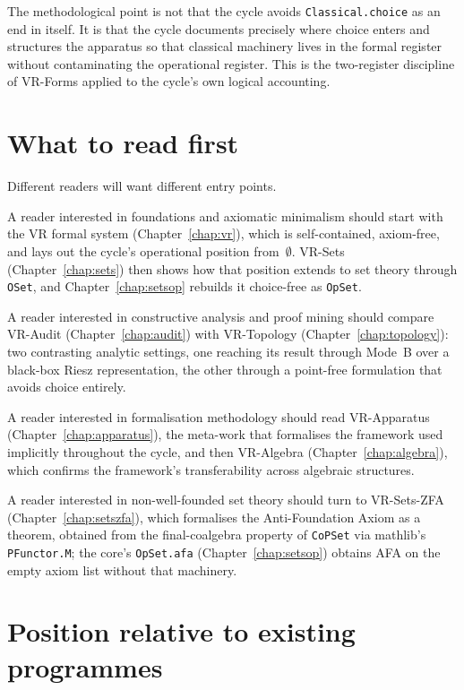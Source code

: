 The methodological point is not that the cycle avoids
\texttt{Classical.choice} as an end in itself.  It is that the cycle
documents precisely where choice enters and structures the apparatus so
that classical machinery lives in the formal register without contaminating
the operational register.  This is the two-register discipline of VR-Forms
applied to the cycle's own logical accounting.

\section{What to read first}
\label{sec:overview_reading}

Different readers will want different entry points.

A reader interested in foundations and axiomatic minimalism should start
with the VR formal system (Chapter~\ref{chap:vr}), which is self-contained,
axiom-free, and lays out the cycle's operational position from~$\emptyset$.
VR-Sets (Chapter~\ref{chap:sets}) then shows how that position extends to set
theory through \texttt{OSet}, and Chapter~\ref{chap:setsop} rebuilds it
choice-free as \texttt{OpSet}.

A reader interested in constructive analysis and proof mining should
compare VR-Audit (Chapter~\ref{chap:audit}) with VR-Topology
(Chapter~\ref{chap:topology}): two contrasting analytic settings, one reaching
its result through Mode~B over a black-box Riesz representation, the other
through a point-free formulation that avoids choice entirely.

A reader interested in formalisation methodology should read VR-Apparatus
(Chapter~\ref{chap:apparatus}), the meta-work that formalises the framework
used implicitly throughout the cycle, and then VR-Algebra
(Chapter~\ref{chap:algebra}), which confirms the framework's transferability
across algebraic structures.

A reader interested in non-well-founded set theory should turn to
VR-Sets-ZFA (Chapter~\ref{chap:setszfa}), which formalises the Anti-Foundation
Axiom as a theorem, obtained from the final-coalgebra property of
\texttt{CoPSet} via mathlib's \texttt{PFunctor.M}; the core's
\texttt{OpSet.afa} (Chapter~\ref{chap:setsop}) obtains AFA on the empty
axiom list without that machinery.

\section{Position relative to existing programmes}
\label{sec:overview_position}

